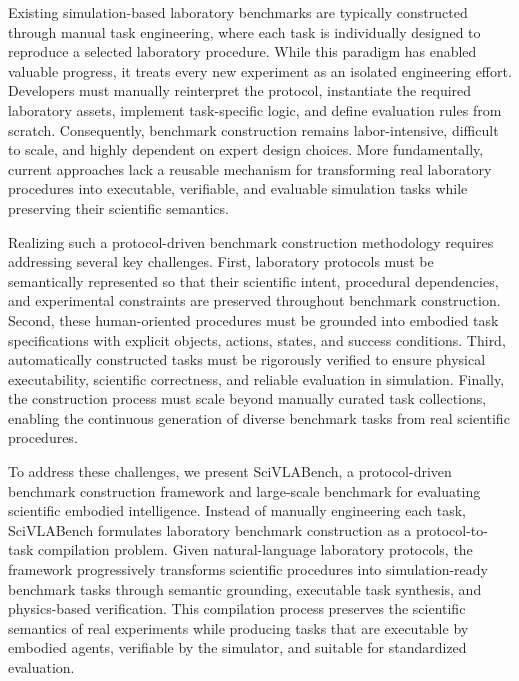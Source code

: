 \documentclass[sigconf]{acmart}
\begin{document}
Existing simulation-based laboratory benchmarks are typically constructed through manual task engineering, where each task is individually designed to reproduce a selected laboratory procedure. While this paradigm has enabled valuable progress, it treats every new experiment as an isolated engineering effort. Developers must manually reinterpret the protocol, instantiate the required laboratory assets, implement task-specific logic, and define evaluation rules from scratch. Consequently, benchmark construction remains labor-intensive, difficult to scale, and highly dependent on expert design choices. More fundamentally, current approaches lack a reusable mechanism for transforming real laboratory procedures into executable, verifiable, and evaluable simulation tasks while preserving their scientific semantics.

Realizing such a protocol-driven benchmark construction methodology requires addressing several key challenges. First, laboratory protocols must be semantically represented so that their scientific intent, procedural dependencies, and experimental constraints are preserved throughout benchmark construction. Second, these human-oriented procedures must be grounded into embodied task specifications with explicit objects, actions, states, and success conditions. Third, automatically constructed tasks must be rigorously verified to ensure physical executability, scientific correctness, and reliable evaluation in simulation. Finally, the construction process must scale beyond manually curated task collections, enabling the continuous generation of diverse benchmark tasks from real scientific procedures.

To address these challenges, we present SciVLABench, a protocol-driven benchmark construction framework and large-scale benchmark for evaluating scientific embodied intelligence. Instead of manually engineering each task, SciVLABench formulates laboratory benchmark construction as a protocol-to-task compilation problem. Given natural-language laboratory protocols, the framework progressively transforms scientific procedures into simulation-ready benchmark tasks through semantic grounding, executable task synthesis, and physics-based verification. This compilation process preserves the scientific semantics of real experiments while producing tasks that are executable by embodied agents, verifiable by the simulator, and suitable for standardized evaluation.
\end{document}
